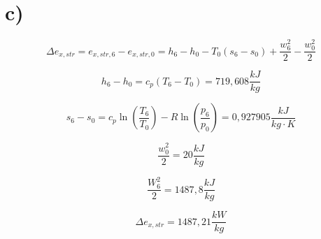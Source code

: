

\section*{c)}

\[
\Delta e_{x,str} = e_{x,str,6} - e_{x,str,0} = h_6 - h_0 - T_0 (s_6 - s_0) + \frac{w_6^2}{2} - \frac{w_0^2}{2}
\]

\[
h_6 - h_0 = c_p (T_6 - T_0) = 719,608 \frac{kJ}{kg}
\]

\[
s_6 - s_0 = c_p \ln \left( \frac{T_6}{T_0} \right) - R \ln \left( \frac{p_6}{p_0} \right) = 0,927905 \frac{kJ}{kg \cdot K}
\]

\[
\frac{w_0^2}{2} = 20 \frac{kJ}{kg}
\]

\[
\frac{W_6^2}{2} = 1487,8 \frac{kJ}{kg}
\]

\[
\Delta e_{x,str} = 1487,21 \frac{kW}{kg}
\]